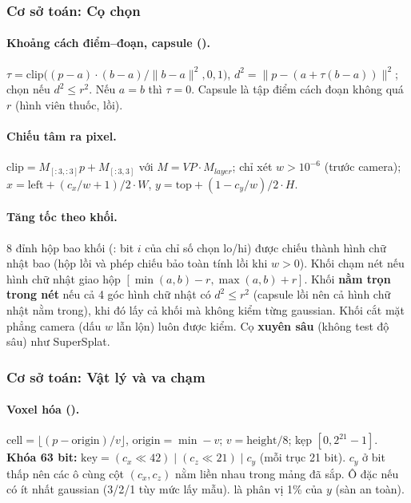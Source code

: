 \subsubsection{Cơ sở toán: Cọ chọn}\label{s:brush}

\paragraph{Khoảng cách điểm--đoạn, capsule ().}
$\tau=\mathrm{clip}\!\big((p-a)\cdot(b-a)/\|b-a\|^2,0,1\big)$, $d^2=\|p-(a+\tau(b-a))\|^2$; chọn nếu $d^2\le r^2$. Nếu $a=b$ thì $\tau=0$. Capsule là tập điểm cách đoạn không quá $r$ (hình viên thuốc, lồi).

\paragraph{Chiếu tâm ra pixel.}
$\mathrm{clip}=M_{[:3,:3]}p+M_{[:3,3]}$ với $M=VP\cdot M_{layer}$; chỉ xét $w>10^{-6}$ (trước camera); $x=\mathrm{left}+(c_x/w+1)/2\cdot W$, $y=\mathrm{top}+(1-c_y/w)/2\cdot H$.

\paragraph{Tăng tốc theo khối.}
8 đỉnh hộp bao khối (: bit $i$ của chỉ số chọn lo/hi) được chiếu thành hình chữ nhật bao (hộp lồi và phép chiếu bảo toàn tính lồi khi $w>0$). Khối chạm nét nếu hình chữ nhật giao hộp $[\min(a,b)-r,\max(a,b)+r]$. Khối \textbf{nằm trọn trong nét} nếu cả 4 góc hình chữ nhật có $d^2\le r^2$ (capsule lồi nên cả hình chữ nhật nằm trong), khi đó lấy cả khối mà không kiểm từng gaussian. Khối cắt mặt phẳng camera (dấu $w$ lẫn lộn) luôn được kiểm. Cọ \textbf{xuyên sâu} (không test độ sâu) như SuperSplat.
\subsubsection{Cơ sở toán: Vật lý và va chạm}\label{s:phys}

\paragraph{Voxel hóa ().}
$\mathrm{cell}=\lfloor(p-\mathrm{origin})/v\rfloor$, $\mathrm{origin}=\min-v$; $v=\mathrm{height}/8$; kẹp $[0,2^{21}-1]$. \textbf{Khóa 63 bit:} $\mathrm{key}=(c_x\ll42)\mid(c_z\ll21)\mid c_y$ (mỗi trục 21 bit). $c_y$ ở bit thấp nên các ô cùng cột $(c_x,c_z)$ nằm liền nhau trong mảng đã sắp. Ô đặc nếu có ít nhất  gaussian (3/2/1 tùy mức lấy mẫu).  là phân vị 1\% của $y$ (sàn an toàn).

